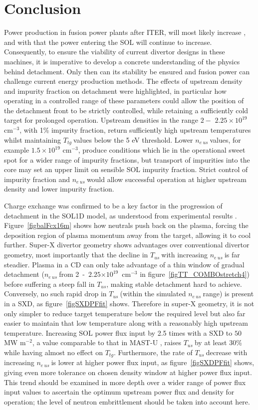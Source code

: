 \documentclass[12pt]{article}  %
\providecommand{\e}[1]{\ensuremath{\times 10^{#1}}} %
\providecommand{\noNe}[1]{{${#1}\times 10^{19}$ cm$^{-3}$}} %
\providecommand{\pow}[1]{{$^{#1}$}} %
\providecommand{\neus}{$n_{e~us}~$} %
\providecommand{\Tus}{$T_{us}~$} %
\providecommand{\Ttg}{$T_{tg}~$} %
\begin{document}
\section{Conclusion}\label{secConclusion}
Power production in fusion power plants after ITER, will most likely increase \cite{Federici2014}, and with that the power entering the SOL will continue to increase. Consequently, to ensure the viability of current divertor designs in these machines, it is imperative to develop a concrete understanding of the physics behind detachment. Only then can its stability be ensured and fusion power can challenge current energy production methods. The effects of upstream density and impurity fraction on detachment were highlighted, in particular how operating in a controlled range of these parameters could allow the position of the detachment front to be strictly controlled, while retaining a sufficiently cold target for prolonged operation. Upstream densities in the range $2 -$ \noNe{2.25}, with 1\% impurity fraction, return sufficiently high upstream temperatures whilst maintaining \Ttg values below the 5 eV threshold. Lower \neus values, for example \noNe{1.5}, produce conditions which lie in the operational sweet spot for a wider range of impurity fractions, but transport of impurities into the core may set an upper limit on sensible SOL impurity fraction. Strict control of impurity fraction and \neus would allow successful operation at higher upstream density and lower impurity fraction. 

Charge exchange was confirmed to be a key factor in the progression of detachment in the SOL1D model, as understood from experimental results \cite{Loarte1998, Wischmeier2009}. Figure~\ref{figbalFcx16m} shows how neutrals push back on the plasma, forcing the deposition region of plasma momentum away from the target, allowing it to cool further. Super-X divertor geometry shows advantages over conventional divertor geometry, most importantly that the decline in \Tus with increasing \neus is far steadier. Plasma in a CD can only take advantage of a thin window of gradual detachment (\neus from 2~-~$2.25\e{19}$~cm\pow{-3} in figure~\ref{figTT_COMBOstretch4}) before suffering a steep fall in $T_{us}$, making stable detachment hard to achieve. Conversely, no such rapid drop in \Tus (within the simulated \neus range) is present in a SXD, as figure~\ref{figSXDPFfit} shows. Therefore in super-X geometry, it is not only simpler to reduce target temperature below the required level but also far easier to maintain that low temperature along with a reasonably high upstream temperature. Increasing SOL power flux input by 2.5 times with a SXD to $50$ MW m\pow{-2}, a value comparable to that in MAST-U \cite{Havlickova2014}, raises \Tus by at least 30\% while having almost no effect on $T_{tg}$. Furthermore, the rate of \Tus decrease with increasing \neus is lower at higher power flux input, as figure~\ref{figSXDPFfit} shows, giving even more tolerance on chosen density window at higher power flux input. This trend should be examined in more depth over a wider range of power flux input values to ascertain the optimum upstream power flux and density for operation; the level of neutron embrittlement should be taken into account here.
\end{document}
